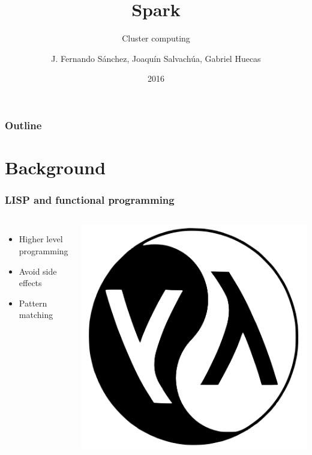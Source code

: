 \documentclass{beamer}
\title{Spark}
\subtitle{Cluster computing}
\author{J. Fernando Sánchez, Joaquín Salvachúa, Gabriel Huecas }
\institute{Universidad Politécnica de Madrid}
\date{2016}
\begin{document}
\begin{frame}
\titlepage{}
\end{frame}
\begin{frame}[allowframebreaks]
\frametitle{Outline}
\tableofcontents
\end{frame}

\section{Background}

\begin{frame}
  \frametitle{LISP and functional programming}
  \begin{columns}
  \begin{itemize}
  \item Higher level programming
  \item Avoid side effects
  \item Pattern matching
  \end{itemize}
  \includegraphics[width=\textwidth]{images/lisplogo.png}
\end{columns}
\end{frame}
\end{document}
